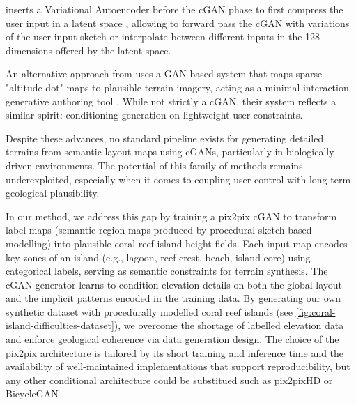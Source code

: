  inserts a Variational Autoencoder \cite{Kingma2022} before the cGAN phase to first compress the user input in a latent space \cite{Naik2022}, allowing to forward pass the cGAN with variations of the user input sketch or interpolate between different inputs in the 128 dimensions offered by the latent space. 

An alternative approach from  uses a GAN-based system that maps sparse "altitude dot" maps to plausible terrain imagery, acting as a minimal-interaction generative authoring tool \cite{Voulgaris2021}. While not strictly a cGAN, their system reflects a similar spirit: conditioning generation on lightweight user constraints. %

Despite these advances, no standard pipeline exists for generating detailed terrains from semantic layout maps using cGANs, particularly in biologically driven environments. The potential of this family of methods remains underexploited, especially when it comes to coupling user control with long-term geological plausibility.

\midConclusion

In our method, we address this gap by training a pix2pix cGAN to transform label maps (semantic region maps produced by procedural sketch-based modelling) into plausible coral reef island height fields. Each input map encodes key zones of an island (e.g., lagoon, reef crest, beach, island core) using categorical labels, serving as semantic constraints for terrain synthesis. The cGAN generator learns to condition elevation details on both the global layout and the implicit patterns encoded in the training data. By generating our own synthetic dataset with procedurally modelled coral reef islands (see \cref{fig:coral-island-difficulties-dataset}), we overcome the shortage of labelled elevation data and enforce geological coherence via data generation design. The choice of the pix2pix architecture is tailored by its short training and inference time and the availability of well-maintained implementations that support reproducibility, but any other conditional architecture could be substitued such as pix2pixHD or BicycleGAN \cite{Wang2018,Zhu2018NN}.

